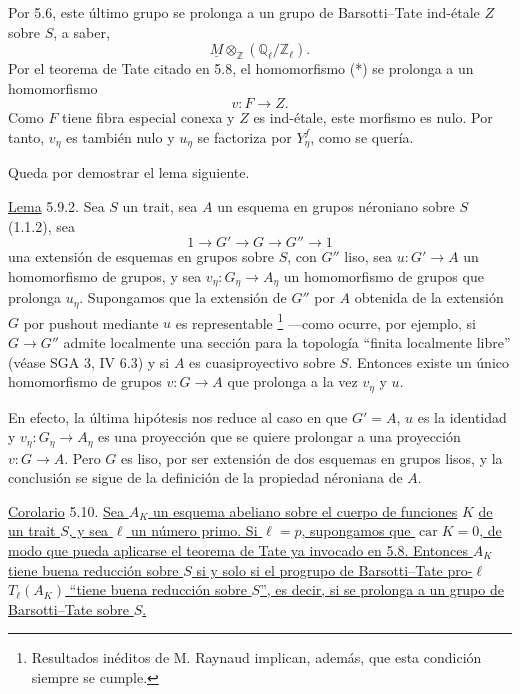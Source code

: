 
Por 5.6, este último grupo se prolonga a un grupo de Barsotti--Tate
ind-étale $Z$ sobre $S$, a saber,
\[
 \underline M\otimes_{\mathbb Z}(\mathbb Q_\ell/\mathbb Z_\ell).
\]
Por el teorema de Tate citado en 5.8, el homomorfismo (*) se prolonga a
un homomorfismo
\[
 v:F\longrightarrow Z.
\]
Como $F$ tiene fibra especial conexa y $Z$ es ind-étale, este morfismo
es nulo. Por tanto, $v_\eta$ es también nulo y $u_\eta$ se factoriza por
$Y_\eta^f$, como se quería.

Queda por demostrar el lema siguiente.

\medskip
\noindent
\underline{Lema} 5.9.2. Sea $S$ un trait, sea $A$ un esquema en grupos
néroniano sobre $S$ (1.1.2), sea
\[
 1\longrightarrow G'\longrightarrow G\longrightarrow G''
 \longrightarrow1
\]
una extensión de esquemas en grupos sobre $S$, con $G''$ liso, sea
$u:G'\longrightarrow A$ un homomorfismo de grupos, y sea
$v_\eta:G_\eta\longrightarrow A_\eta$ un homomorfismo de grupos que
prolonga $u_\eta$. Supongamos que la extensión de $G''$ por $A$
obtenida de la extensión $G$ por pushout mediante $u$ es representable
\footnote{Resultados inéditos de M. Raynaud implican, además, que esta
condición siempre se cumple.} —como ocurre, por ejemplo, si
$G\longrightarrow G''$ admite localmente una sección para la topología
``finita localmente libre'' (véase SGA 3, IV 6.3) y si $A$ es
cuasiproyectivo sobre $S$. Entonces existe un único homomorfismo de
grupos $v:G\longrightarrow A$ que prolonga a la vez $v_\eta$ y $u$.


En efecto, la última hipótesis nos reduce al caso en que $G'=A$, $u$
es la identidad y $v_\eta:G_\eta\longrightarrow A_\eta$ es una
proyección que se quiere prolongar a una proyección
$v:G\longrightarrow A$. Pero $G$ es liso, por ser extensión de dos
esquemas en grupos lisos, y la conclusión se sigue de la definición de
la propiedad néroniana de $A$.

\medskip
\noindent
\underline{Corolario} 5.10. \underline{Sea $A_K$ un esquema abeliano
sobre el cuerpo de funciones} $K$ \underline{de un trait $S$, y sea $\ell$ un
número primo. Si $\ell=p$, supongamos que $\operatorname{car}K=0$, de
modo que pueda aplicarse el teorema de Tate ya invocado en 5.8. Entonces
$A_K$ tiene buena reducción sobre $S$ si y solo si el progrupo de
Barsotti--Tate pro-$\ell$ $T_\ell(A_K)$ ``tiene buena reducción sobre
$S$'', es decir, si se prolonga a un grupo de Barsotti--Tate sobre $S$.}


